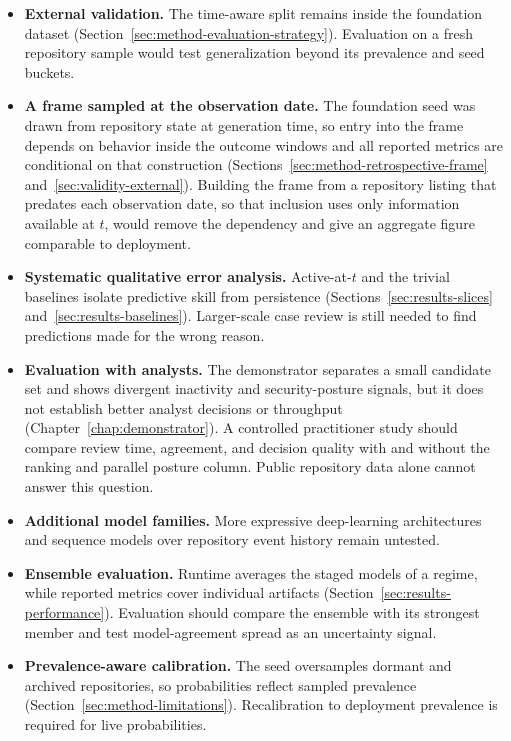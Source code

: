 \begin{itemize}
    \item \textbf{External validation.} The time-aware split remains inside the foundation dataset (Section~\ref{sec:method-evaluation-strategy}). Evaluation on a fresh repository sample would test generalization beyond its prevalence and seed buckets.
    \item \textbf{A frame sampled at the observation date.} The foundation seed was drawn from repository state at generation time, so entry into the frame depends on behavior inside the outcome windows and all reported metrics are conditional on that construction (Sections~\ref{sec:method-retrospective-frame} and~\ref{sec:validity-external}). Building the frame from a repository listing that predates each observation date, so that inclusion uses only information available at \(t\), would remove the dependency and give an aggregate figure comparable to deployment.
    \item \textbf{Systematic qualitative error analysis.} Active-at-\(t\) and the trivial baselines isolate predictive skill from persistence (Sections~\ref{sec:results-slices} and~\ref{sec:results-baselines}). Larger-scale case review is still needed to find predictions made for the wrong reason.
    \item \textbf{Evaluation with analysts.} The demonstrator separates a small candidate set and shows divergent inactivity and security-posture signals, but it does not establish better analyst decisions or throughput (Chapter~\ref{chap:demonstrator}). A controlled practitioner study should compare review time, agreement, and decision quality with and without the ranking and parallel posture column. Public repository data alone cannot answer this question.
    \item \textbf{Additional model families.} More expressive deep-learning architectures and sequence models over repository event history remain untested.
    \item \textbf{Ensemble evaluation.} Runtime averages the staged models of a regime, while reported metrics cover individual artifacts (Section~\ref{sec:results-performance}). Evaluation should compare the ensemble with its strongest member and test model-agreement spread as an uncertainty signal.
    \item \textbf{Prevalence-aware calibration.} The seed oversamples dormant and archived repositories, so probabilities reflect sampled prevalence (Section~\ref{sec:method-limitations}). Recalibration to deployment prevalence is required for live probabilities.

\end{itemize}
